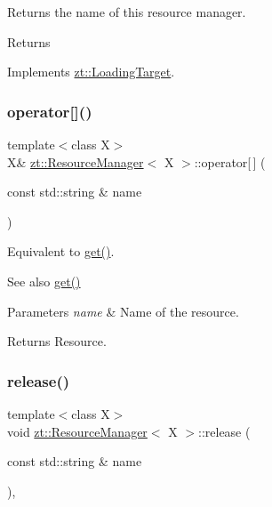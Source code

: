 Returns the name of this resource manager. \begin{DoxyReturn}{Returns}

\end{DoxyReturn}


Implements \hyperlink{classzt_1_1_loading_target}{zt\+::\+Loading\+Target}.

\mbox{\label{classzt_1_1_resource_manager_a4eeebff68670999944d5a663bbf2c9ed}} 
\subsubsection{\texorpdfstring{operator[]()}{operator[]()}}
{\footnotesize\ttfamily template$<$class X$>$ \\
X\& \hyperlink{classzt_1_1_resource_manager}{zt\+::\+Resource\+Manager}$<$ X $>$\+::operator\mbox{[}$\,$\mbox{]} (\begin{DoxyParamCaption}\item[{const std\+::string \&}]{name }\end{DoxyParamCaption})\hspace{0.3cm}{\ttfamily [inline]}}

Equivalent to \hyperlink{classzt_1_1_resource_manager_a5db7d69f549152f521d3e6dc8dceab9d}{get()}. \begin{DoxySeeAlso}{See also}
\hyperlink{classzt_1_1_resource_manager_a5db7d69f549152f521d3e6dc8dceab9d}{get()} 
\end{DoxySeeAlso}

\begin{DoxyParams}{Parameters}
{\em name} & Name of the resource. \\
\hline
\end{DoxyParams}
\begin{DoxyReturn}{Returns}
Resource. 
\end{DoxyReturn}
\mbox{\label{classzt_1_1_resource_manager_ad89a189ae9a569688fba24a053e2cd21}} 
\subsubsection{\texorpdfstring{release()}{release()}}
{\footnotesize\ttfamily template$<$class X$>$ \\
void \hyperlink{classzt_1_1_resource_manager}{zt\+::\+Resource\+Manager}$<$ X $>$\+::release (\begin{DoxyParamCaption}\item[{const std\+::string \&}]{name }\end{DoxyParamCaption})\hspace{0.3cm}{\ttfamily [inline]}, {\ttfamily [virtual]}}

